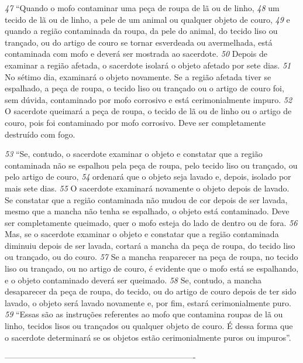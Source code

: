 \bigskip 
\textit{\tiny 47}
“Quando o mofo
 contaminar uma peça de roupa de lã ou de linho, 
\textit{\tiny 48}
um
tecido de lã ou de linho, a pele de um animal ou qualquer objeto de couro, 
\textit{\tiny 49}
e
quando a região contaminada da roupa, da pele do animal, do tecido liso ou
trançado, ou do artigo de couro se tornar esverdeada ou avermelhada, está
contaminada com mofo e deverá ser mostrada ao sacerdote. 
\textit{\tiny 50}
Depois de
examinar a região afetada, o sacerdote isolará o objeto afetado por sete dias. 
\textit{\tiny 51}
No
sétimo dia, examinará o objeto novamente. Se a região afetada tiver se espalhado,
a peça de roupa, o tecido liso ou trançado ou o artigo de couro foi, sem dúvida,
contaminado por mofo corrosivo e está cerimonialmente impuro. 
\textit{\tiny 52}
O sacerdote
queimará a peça de roupa, o tecido de lã ou de linho ou o artigo de couro, pois foi
contaminado por mofo corrosivo. Deve ser completamente destruído com fogo.

\smallskip   
\textit{\tiny 53}
“Se, contudo, o sacerdote examinar o objeto e constatar que a região
contaminada não se espalhou pela peça de roupa, pelo tecido liso ou trançado, ou
pelo artigo de couro, 
\textit{\tiny 54}
ordenará que o objeto seja lavado e, depois, isolado por
mais sete dias. 
\textit{\tiny 55}
O sacerdote examinará novamente o objeto depois de lavado. Se
constatar que a região contaminada não mudou de cor depois de ser lavada,
mesmo que a mancha não tenha se espalhado, o objeto está contaminado. Deve
ser completamente queimado, quer o mofo esteja do lado de dentro ou de fora.
\textit{\tiny 56}
Mas, se o sacerdote examinar o objeto e constatar que a região contaminada
diminuiu depois de ser lavada, cortará a mancha da peça de roupa, do tecido liso
ou trançado, ou do couro. 
\textit{\tiny 57}
Se a mancha reaparecer na peça de roupa, no tecido
liso ou trançado, ou no artigo de couro, é evidente que o mofo está se espalhando,
e o objeto contaminado deverá ser queimado. 
\textit{\tiny 58}
Se, contudo, a mancha
desaparecer da peça de roupa, do tecido, ou do artigo de couro depois de ter sido
lavado, o objeto será lavado novamente e, por fim, estará cerimonialmente puro.
\textit{\tiny 59}
“Essas são as instruções referentes ao mofo que contamina roupas de lã ou
linho, tecidos lisos ou trançados ou qualquer objeto de couro. É dessa forma que o
sacerdote determinará se os objetos estão cerimonialmente puros ou impuros”.

----------------------------------------------------------------------
